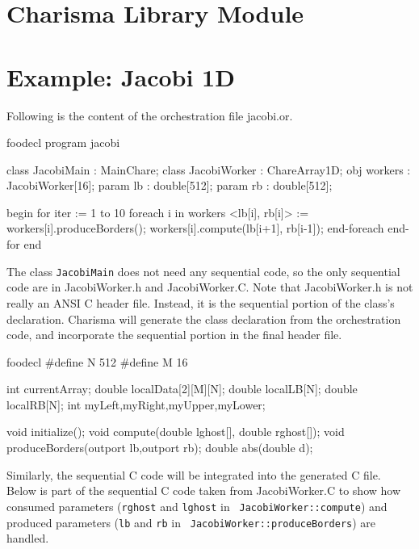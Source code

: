\documentclass[10pt]{article}
\def\smallfbox#1{\small \fbox{#1}}
\begin{document}
\section{Charisma Library Module}
\label{sec:module}

\appendix

\section{Example: Jacobi 1D}
Following is the content of the orchestration file jacobi.or. 

\begin{SaveVerbatim}{foodecl}
program jacobi

class  JacobiMain : MainChare;
class  JacobiWorker : ChareArray1D;
obj  workers : JacobiWorker[16];
param  lb : double[512];
param  rb : double[512];

begin
    for iter := 1 to 10
	foreach i in workers
	    <lb[i], rb[i]> := workers[i].produceBorders();
	    workers[i].compute(lb[i+1], rb[i-1]);
	end-foreach
    end-for
end
\end{SaveVerbatim}
\vspace{0.1in}
\smallfbox{\BUseVerbatim{foodecl}}
\vspace{0.1in}

The class {\tt JacobiMain} does not need any sequential code, so the only
sequential code are in JacobiWorker.h and JacobiWorker.C. Note that
JacobiWorker.h is not really an ANSI C header file. Instead, it is the
sequential portion of the class's declaration. Charisma will generate the class
declaration from the orchestration code, and incorporate the sequential portion
in the final header file. 

\begin{SaveVerbatim}{foodecl}
#define N 512
#define M 16

int currentArray;	
double localData[2][M][N]; 
double localLB[N];
double localRB[N];
int myLeft,myRight,myUpper,myLower;

void initialize();
void compute(double lghost[], double rghost[]);
void produceBorders(outport lb,outport rb);
double abs(double d);
\end{SaveVerbatim}
\vspace{0.1in}
\smallfbox{\BUseVerbatim{foodecl}}
\vspace{0.1in}

Similarly, the sequential C code will be integrated into the generated C file.
Below is part of the sequential C code taken from JacobiWorker.C to show how
consumed parameters ({\tt rghost} and {\tt lghost} in {\tt
JacobiWorker::compute}) and produced parameters ({\tt lb} and {\tt rb} in {\tt
JacobiWorker::produceBorders}) are handled.
\end{document}
